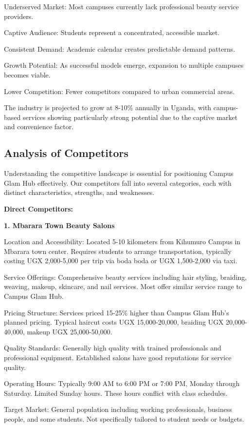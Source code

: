 \documentclass[a4paper,12pt]{article}
\begin{document}
Underserved Market: Most campuses currently lack professional beauty service providers.

Captive Audience: Students represent a concentrated, accessible market.

Consistent Demand: Academic calendar creates predictable demand patterns.

Growth Potential: As successful models emerge, expansion to multiple campuses becomes viable.

Lower Competition: Fewer competitors compared to urban commercial areas.

The industry is projected to grow at 8-10\% annually in Uganda, with campus-based services showing particularly strong potential due to the captive market and convenience factor.

\subsection{Analysis of Competitors}

Understanding the competitive landscape is essential for positioning Campus Glam Hub effectively. Our competitors fall into several categories, each with distinct characteristics, strengths, and weaknesses.

\textbf{Direct Competitors:}

\textbf{1. Mbarara Town Beauty Salons}

Location and Accessibility: Located 5-10 kilometers from Kihumuro Campus in Mbarara town center. Requires students to arrange transportation, typically costing UGX 2,000-5,000 per trip via boda boda or UGX 1,500-2,000 via taxi.

Service Offerings: Comprehensive beauty services including hair styling, braiding, weaving, makeup, skincare, and nail services. Most offer similar service range to Campus Glam Hub.

Pricing Structure: Services priced 15-25\% higher than Campus Glam Hub's planned pricing. Typical haircut costs UGX 15,000-20,000, braiding UGX 20,000-40,000, makeup UGX 25,000-50,000.

Quality Standards: Generally high quality with trained professionals and professional equipment. Established salons have good reputations for service quality.

Operating Hours: Typically 9:00 AM to 6:00 PM or 7:00 PM, Monday through Saturday. Limited Sunday hours. These hours conflict with class schedules.

Target Market: General population including working professionals, business people, and some students. Not specifically tailored to student needs or budgets.
\end{document}
